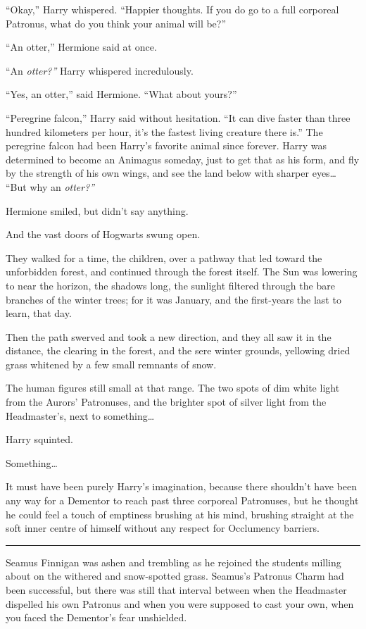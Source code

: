 ``Okay,'' Harry whispered. ``Happier thoughts. If you do go to a full
corporeal Patronus, what do you think your animal will be?''

``An otter,'' Hermione said at once.

``An \emph{otter?''} Harry whispered incredulously.

``Yes, an otter,'' said Hermione. ``What about yours?''

``Peregrine falcon,'' Harry said without hesitation. ``It can dive
faster than three hundred kilometers per hour, it's the fastest living
creature there is.'' The peregrine falcon had been Harry's favorite
animal since forever. Harry was determined to become an Animagus
someday, just to get that as his form, and fly by the strength of his
own wings, and see the land below with sharper eyes\ldots{} ``But why an
\emph{otter?''}

Hermione smiled, but didn't say anything.

And the vast doors of Hogwarts swung open.

They walked for a time, the children, over a pathway that led toward the
unforbidden forest, and continued through the forest itself. The Sun was
lowering to near the horizon, the shadows long, the sunlight filtered
through the bare branches of the winter trees; for it was January, and
the first-years the last to learn, that day.

Then the path swerved and took a new direction, and they all saw it in
the distance, the clearing in the forest, and the sere winter grounds,
yellowing dried grass whitened by a few small remnants of snow.

The human figures still small at that range. The two spots of dim white
light from the Aurors' Patronuses, and the brighter spot of silver light
from the Headmaster's, next to something\ldots{}

Harry squinted.

Something\ldots{}

It must have been purely Harry's imagination, because there shouldn't
have been any way for a Dementor to reach past three corporeal
Patronuses, but he thought he could feel a touch of emptiness brushing
at his mind, brushing straight at the soft inner centre of himself
without any respect for Occlumency barriers.

\begin{center}\rule{3in}{0.4pt}\end{center}

Seamus Finnigan was ashen and trembling as he rejoined the students
milling about on the withered and snow-spotted grass. Seamus's Patronus
Charm had been successful, but there was still that interval between
when the Headmaster dispelled his own Patronus and when you were
supposed to cast your own, when you faced the Dementor's fear
unshielded.

